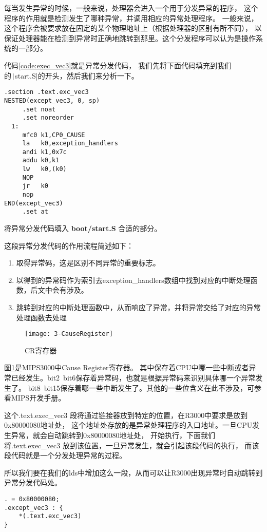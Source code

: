每当发生异常的时候，一般来说，处理器会进入一个用于分发异常的程序，
这个程序的作用就是检测发生了哪种异常，并调用相应的异常处理程序。
一般来说，这个程序会被要求放在固定的某个物理地址上（根据处理器的区别有所不同），
以保证处理器能在检测到异常时正确地跳转到那里。这个分发程序可以认为是操作系统的一部分。

代码\ref{code:exec_vec3}就是异常分发代码，
我们先将下面代码填充到我们的\texttt|start.S|的开头，然后我们来分析一下。

\label{code:exec_vec3}
\begin{verbatim}
.section .text.exc_vec3
NESTED(except_vec3, 0, sp)
     .set noat
     .set noreorder
  1:
     mfc0 k1,CP0_CAUSE
     la   k0,exception_handlers
     andi k1,0x7c
     addu k0,k1
     lw   k0,(k0)
     NOP
     jr   k0
     nop
END(except_vec3)
     .set at
\end{verbatim}

\begin{exercise}
将异常分发代码填入 \textbf{boot/start.S} 合适的部分。
\end{exercise}

这段异常分发代码的作用流程简述如下：
\begin{enumerate}
  \item 取得异常码，这是区别不同异常的重要标志。
  \item 以得到的异常码作为索引去exception\_handlers数组中找到对应的中断处理函数，后文中会有涉及。
  \item 跳转到对应的中断处理函数中，从而响应了异常，并将异常交给了对应的异常处理函数去处理
\end{enumerate}

\begin{figure}[htbp]
  \centering
  \texttt{[image: 3-CauseRegister]}
  \caption{CR寄存器}\label{fig:3-CauseRegister} 
\end{figure}
图\ref{fig:3-CauseRegister}是MIPS3000中Cause Register寄存器。
其中保存着CPU中哪一些中断或者异常已经发生。bit2~bit6保存着异常码，也就是根据异常码来识别具体哪一个异常发生了。
bit8~bit15保存着哪一些中断发生了。其他的一些位含义在此不涉及，可参看MIPS开发手册。

这个.text.exec\_vec3 段将通过链接器放到特定的位置，在R3000中要求是放到0x80000080地址处，
这个地址处存放的是异常处理程序的入口地址。一旦CPU发生异常，就会自动跳转到0x80000080地址处，
开始执行，下面我们将.text.exec\_vec3 放到该位置，一旦异常发生，就会引起该段代码的执行，
而该段代码就是一个分发处理异常的过程。

所以我们要在我们的lds中增加这么一段，从而可以让R3000出现异常时自动跳转到异常分发代码处。
\begin{verbatim}
. = 0x80000080;
.except_vec3 : {
    *(.text.exc_vec3)
}
\end{verbatim}


